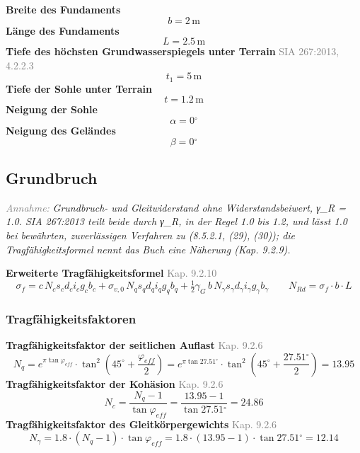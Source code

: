 \documentclass[11pt,a4paper]{article}
\newcommand{\normref}[1]{{\small\textcolor{gray}{#1}}}
\newcommand{\hinweis}[2]{\par\noindent\textcolor{gray}{\textit{#1:}} \textit{#2}\par}
\begin{document}
\noindent\textbf{Breite des Fundaments}
\begin{equation*}
b = 2\,\mathrm{m}
\end{equation*}
\noindent\textbf{Länge des Fundaments}
\begin{equation*}
L = 2.5\,\mathrm{m}
\end{equation*}
\noindent\textbf{Tiefe des höchsten Grundwasserspiegels unter Terrain} \hfill \normref{SIA 267:2013, 4.2.2.3}
\begin{equation*}
t_1 = 5\,\mathrm{m}
\end{equation*}
\noindent\textbf{Tiefe der Sohle unter Terrain}
\begin{equation*}
t = 1.2\,\mathrm{m}
\end{equation*}
\noindent\textbf{Neigung der Sohle}
\begin{equation*}
\alpha = 0{}^{\circ}
\end{equation*}
\noindent\textbf{Neigung des Geländes}
\begin{equation*}
\beta = 0{}^{\circ}
\end{equation*}
\subsection{Grundbruch}
\hinweis{Annahme}{Grundbruch- und Gleitwiderstand ohne Widerstandsbeiwert, γ\_R = 1.0. SIA 267:2013 teilt beide durch γ\_R, in der Regel 1.0 bis 1.2, und lässt 1.0 bei bewährten, zuverlässigen Verfahren zu (8.5.2.1, (29), (30)); die Tragfähigkeitsformel nennt das Buch eine Näherung (Kap. 9.2.9).}
\noindent\textbf{Erweiterte Tragfähigkeitsformel} \hfill \normref{Kap. 9.2.10}
\begin{equation*}
\sigma_f = c \, N_c s_c d_c i_c g_c b_c + \sigma_{v,0} \, N_q s_q d_q i_q g_q b_q + \tfrac{1}{2} \gamma_G \, b \, N_{\gamma} s_{\gamma} d_{\gamma} i_{\gamma} g_{\gamma} b_{\gamma} \qquad N_{Rd} = \sigma_f \cdot b \cdot L
\end{equation*}
\subsubsection{Tragfähigkeitsfaktoren}
\noindent\textbf{Tragfähigkeitsfaktor der seitlichen Auflast} \hfill \normref{Kap. 9.2.6}
\begin{equation*}
N_q = e^{\pi \tan \varphi_{eff}} \cdot \tan^{2}\left(45^\circ + \frac{\varphi_{eff}}{2}\right) = e^{\pi \tan 27.51{}^{\circ}} \cdot \tan^{2}\left(45^\circ + \frac{27.51{}^{\circ}}{2}\right) = 13.95
\end{equation*}
\noindent\textbf{Tragfähigkeitsfaktor der Kohäsion} \hfill \normref{Kap. 9.2.6}
\begin{equation*}
N_c = \frac{N_q - 1}{\tan \varphi_{eff}} = \frac{13.95 - 1}{\tan 27.51{}^{\circ}} = 24.86
\end{equation*}
\noindent\textbf{Tragfähigkeitsfaktor des Gleitkörpergewichts} \hfill \normref{Kap. 9.2.6}
\begin{equation*}
N_{\gamma} = 1.8 \cdot \left(N_q - 1\right) \cdot \tan \varphi_{eff} = 1.8 \cdot \left(13.95 - 1\right) \cdot \tan 27.51{}^{\circ} = 12.14
\end{equation*}
\end{document}
